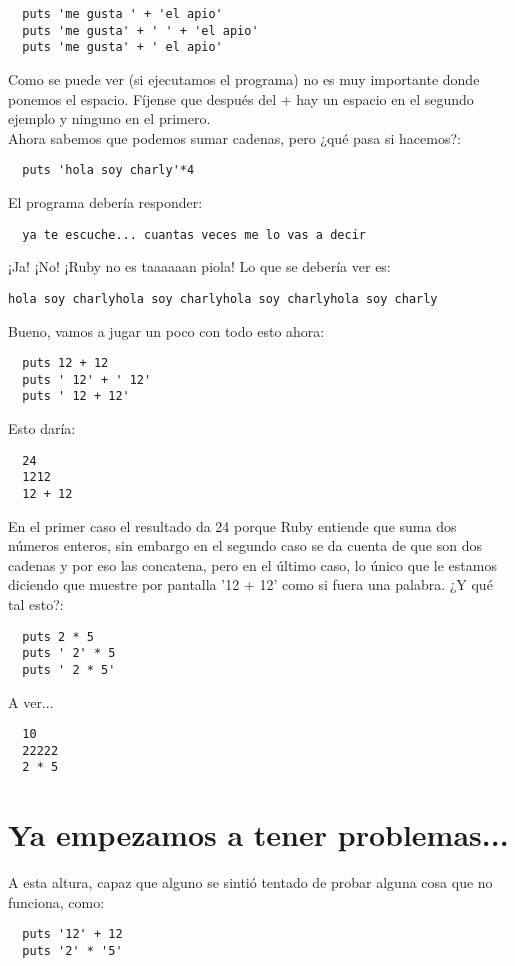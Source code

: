 \begin{lstlisting}
  puts 'me gusta ' + 'el apio'
  puts 'me gusta' + ' ' + 'el apio'
  puts 'me gusta' + ' el apio'
\end{lstlisting}

Como se puede ver (si ejecutamos el programa) no es muy importante donde ponemos el espacio. Fíjense que después del + hay un espacio en el segundo ejemplo y ninguno en el primero.\\%

Ahora sabemos que podemos sumar cadenas, pero ¿qué pasa si hacemos?:

\begin{lstlisting}
  puts 'hola soy charly'*4
\end{lstlisting}

El programa debería responder:
\begin{lstlisting}
  ya te escuche... cuantas veces me lo vas a decir
\end{lstlisting}

¡Ja! ¡No! ¡Ruby no es taaaaaan piola! Lo que se debería ver es:

\begin{lstlisting}
hola soy charlyhola soy charlyhola soy charlyhola soy charly
\end{lstlisting}

Bueno, vamos a jugar un poco con todo esto ahora:
\begin{lstlisting}
  puts 12 + 12
  puts ' 12' + ' 12'
  puts ' 12 + 12'
\end{lstlisting}

Esto daría:
\begin{lstlisting}
  24
  1212
  12 + 12
\end{lstlisting}

En el primer caso el resultado da 24 porque Ruby entiende que suma dos números enteros, sin embargo en el segundo caso se da cuenta de que son dos cadenas y por eso las concatena, pero en el último caso, lo único que le estamos diciendo que muestre por pantalla '12 + 12' como si fuera una palabra. ¿Y qué tal esto?:
\begin{lstlisting}
  puts 2 * 5
  puts ' 2' * 5
  puts ' 2 * 5'
\end{lstlisting}

A ver...
\begin{lstlisting}
  10
  22222
  2 * 5
\end{lstlisting}

\section{Ya empezamos a tener problemas...}
A esta altura, capaz que alguno se sintió tentado de probar alguna cosa que no funciona, como:
\begin{lstlisting}
  puts '12' + 12
  puts '2' * '5'
\end{lstlisting}

